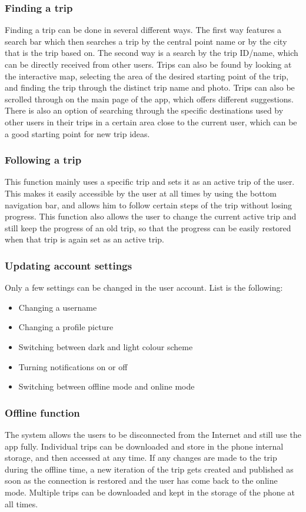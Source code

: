 \subsubsection{Finding a trip}
\hspace{\parindent}Finding a trip can be done in several different ways. The first way features a search bar which then searches a trip by the central point name or by the city that is the trip based on. The second way is a search by the trip ID/name, which can be directly received from other users. Trips can also be found by looking at the interactive map, selecting the area of the desired starting point of the trip, and finding the trip through the distinct trip name and photo. Trips can also be scrolled through on the main page of the app, which offers different suggestions. There is also an option of searching through the specific destinations used by other users in their trips in a certain area close to the current user, which can be a good starting point for new trip ideas.
\subsubsection{Following a trip}
\hspace{\parindent}This function mainly uses a specific trip and sets it as an active trip of the user. This makes it easily accessible by the user at all times by using the bottom navigation bar, and allows him to follow certain steps of the trip without losing progress. This function also allows the user to change the current active trip and still keep the progress of an old trip, so that the progress can be easily restored when that trip is again set as an active trip.
\subsubsection{Updating account settings}
\hspace{\parindent}Only a few settings can be changed in the user account. List is the following:
\begin{itemize}
\item Changing a username
\item Changing a profile picture
\item Switching between dark and light colour scheme
\item Turning notifications on or off
\item Switching between offline mode and online mode
\end{itemize}
\subsubsection{Offline function}
\hspace{\parindent}The system allows the users to be disconnected from the Internet and still use the app fully. Individual trips can be downloaded and store in the phone internal storage, and then accessed at any time. If any changes are made to the trip during the offline time, a new iteration of the trip gets created and published as soon as the connection is restored and the user has come back to the online mode. Multiple trips can be downloaded and kept in the storage of the phone at all times.  
